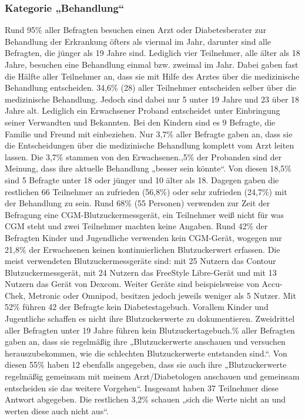 \documentclass[a4paper,11pt]{article}%
\renewcommand{\\}{\vspace*{0.5\baselineskip} \newline}
\begin{document}
\subsubsection{Kategorie „Behandlung“}
	Rund 95\% aller Befragten besuchen einen Arzt oder Diabetesberater zur Behandlung der Erkrankung öfters als viermal im Jahr, darunter sind alle Befragten, die jünger als 19 Jahre sind. Lediglich vier Teilnehmer, alle älter als 18 Jahre, besuchen eine Behandlung einmal bzw. zweimal im Jahr. \newline
	Dabei gaben fast die Hälfte aller Teilnehmer an, dass sie mit Hilfe des Arztes über die medizinische Behandlung entscheiden. 34,6\% (28) aller Teilnehmer entscheiden selber über die medizinische Behandlung. Jedoch sind dabei nur 5 unter 19 Jahre und 23 über 18 Jahre alt. Lediglich ein Erwachsener Proband entscheidet unter Einbringung seiner Verwandten und Bekannten. Bei den Kindern sind es 9 Befragte, die Familie und Freund mit einbeziehen.\newline
	Nur 3,7\% aller Befragte gaben an, dass sie die Entscheidungen über die medizinische Behandlung komplett vom Arzt leiten lassen. Die 3,7\% stammen von den Erwachsenen.,5\% der Probanden sind der Meinung, dass ihre aktuelle Behandlung „besser sein könnte“. Von diesen 18,5\% sind 5 Befragte unter 18 oder jünger und 10 älter als 18. Dagegen gaben die restlichen 66 Teilnehmer an zufrieden (56,8\%) oder sehr zufrieden (24,7\%) mit der Behandlung zu sein.\newline
	Rund 68\% (55 Personen) verwenden zur Zeit der Befragung eine CGM-Blutzuckermessgerät, ein Teilnehmer weiß nicht für was CGM steht und zwei Teilnehmer machten keine Angaben. Rund 42\% der Befragten Kinder und Jugendliche verwenden kein CGM-Gerät, wogegen nur 21,8\% der Erwachsenen keinen kontinuierlichen Blutzuckerwert erfassen.\newline
	Die meist verwendeten Blutzuckermessgeräte sind: mit 25 Nutzern das Contour Blutzuckermessgerät, mit 24 Nutzern das FreeStyle Libre-Gerät und mit 13 Nutzern das Gerät von Dexcom. Weiter Geräte sind beispielsweise von Accu-Chek, Metronic oder Omnipod, besitzen jedoch jeweils weniger als 5 Nutzer.\newline
	Mit 52\% führen 42 der Befragte kein Diabetestagebuch. Vorallem Kinder und Jugentliche schaffen es nicht ihre Blutzuckerwerte zu dokumentieren. Zweidrittel aller Befragten unter 19 Jahre führen kein Blutzuckertagebuch.\% aller Befragten gaben an, dass sie regelmäßig ihre „Blutzuckerwerte anschauen und versuchen herauszubekommen, wie die schlechten Blutzuckerwerte entstanden sind.“. Von diesen 55\% haben 12 ebenfalls angegeben, dass sie auch ihre „Blutzuckerwerte regelmäßig gemeinsam mit meinem Arzt/Diabetologen anschauen und gemeinsam entscheiden sie das weitere Vorgehen“. Insgesamt haben 37 Teilnehmer diese Antwort abgegeben. Die restlichen 3,2\% schauen „sich die Werte nicht an und werten diese auch nicht aus“. \newline
\end{document}
